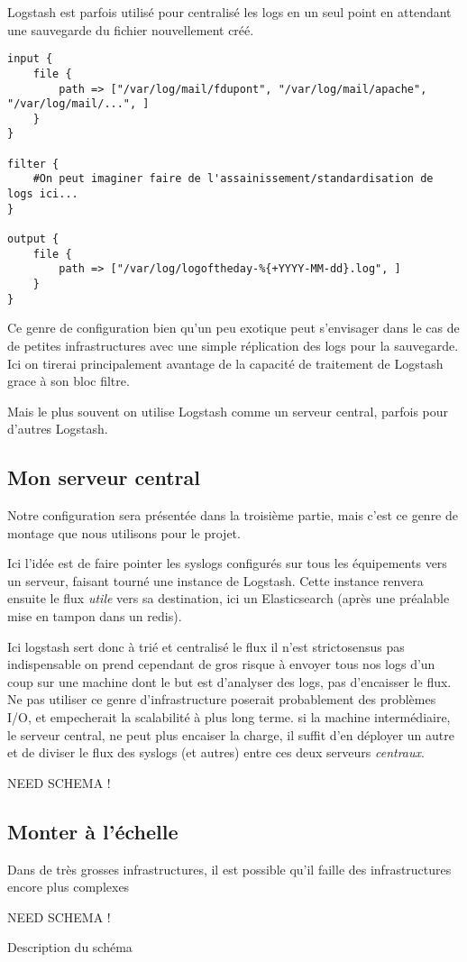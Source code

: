 Logstash est parfois utilisé pour centralisé les logs en un seul point en attendant
une sauvegarde du fichier nouvellement créé.


\begin{lstlisting}[style=logstash,label={lst:conflogstashminimale2},caption={Un autre exemple de configuration minime}]
input {
    file {
        path => ["/var/log/mail/fdupont", "/var/log/mail/apache", "/var/log/mail/...", ]
    }
}

filter {
    #On peut imaginer faire de l'assainissement/standardisation de logs ici...
}

output {
    file {
        path => ["/var/log/logoftheday-%{+YYYY-MM-dd}.log", ]
    }
}
\end{lstlisting}
Ce genre de configuration bien qu'un peu exotique peut s'envisager dans le cas de
de petites infrastructures avec une simple réplication des logs pour la sauvegarde.
Ici on tirerai principalement avantage de la capacité de traitement de Logstash grace
à son bloc filtre.

Mais le plus souvent on utilise Logstash comme un serveur central, parfois pour d'autres
Logstash.
\subsection{Mon serveur central}
Notre configuration sera présentée dans la troisième partie, mais c'est ce genre 
de montage que nous utilisons pour le projet.

Ici l'idée est de faire pointer les syslogs configurés sur tous les équipements vers
un serveur, faisant tourné une instance de Logstash. Cette instance renvera ensuite 
le flux \textit{utile} vers sa destination, ici un Elasticsearch (après une préalable
mise en tampon dans un redis).

Ici logstash sert donc à trié et centralisé le flux il n'est strictosensus pas indispensable
on prend cependant de gros risque à envoyer tous nos logs d'un coup sur une machine
dont le but est d'analyser des logs, pas d'encaisser le flux. 
Ne pas utiliser ce genre d'infrastructure poserait probablement des problèmes I/O,
et empecherait la scalabilité à plus long terme. si la machine intermédiaire, le 
serveur central, ne peut plus encaiser la charge, il suffit d'en déployer un autre
et de diviser le flux des syslogs (et autres) entre ces deux serveurs \textit{centraux}.


{\huge NEED SCHEMA !}
\subsection{Monter à l'échelle}
Dans de très grosses infrastructures, il est possible qu'il faille des infrastructures
encore plus complexes


{\huge NEED SCHEMA !}

Description du schéma



